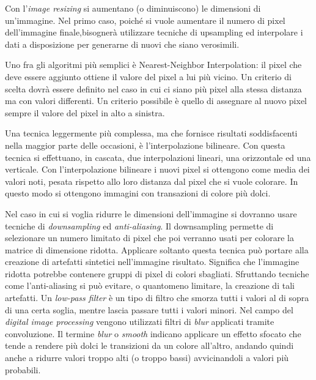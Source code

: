 Con l'\textit{image resizing} si aumentano (o diminuiscono) le dimensioni di un'immagine.
Nel primo caso, poiché si vuole aumentare il numero di pixel dell'immagine finale,bisognerà utilizzare tecniche di upsampling ed interpolare i dati a disposizione per generarne di nuovi che siano verosimili.

Uno fra gli algoritmi più semplici è Nearest-Neighbor Interpolation:
il pixel che deve essere aggiunto ottiene il valore del pixel a lui più vicino.
Un criterio di scelta dovrà essere definito nel caso in cui ci siano più pixel alla stessa distanza ma con valori differenti.
Un criterio possibile è quello di assegnare al nuovo pixel sempre il valore del pixel in alto a sinistra.

Una tecnica leggermente più complessa, ma che fornisce risultati soddisfacenti nella maggior parte delle occasioni, è l'interpolazione bilineare.
Con questa tecnica si effettuano, in cascata, due interpolazioni lineari, una orizzontale ed una verticale.
Con l'interpolazione bilineare i nuovi pixel si ottengono come media dei valori noti, pesata rispetto allo loro distanza dal pixel che si vuole colorare.
In questo modo si ottengono immagini con transazioni di colore più dolci.



Nel caso in cui si voglia ridurre le dimensioni dell'immagine si dovranno usare tecniche di \textit{downsampling} ed \textit{anti-aliasing}.
Il downsampling permette di selezionare un numero limitato di pixel che poi verranno usati per colorare la matrice di dimensione ridotta.
Applicare soltanto questa tecnica può portare alla creazione di artefatti sintetici nell'immagine risultato.
Significa che l'immagine ridotta potrebbe contenere gruppi di pixel di colori sbagliati.
Sfruttando tecniche come l'anti-aliasing si può evitare, o quantomeno limitare, la creazione di tali artefatti.
Un \textit{low-pass filter} è un tipo di filtro che smorza tutti i valori al di sopra di una certa soglia, mentre lascia passare tutti i valori minori.
Nel campo del \textit{digital image processing} vengono utilizzati filtri di \textit{blur} applicati tramite convoluzione.
Il termine \textit{blur} o \textit{smooth} indicano applicare un effetto sfocato che tende a rendere più dolci le transizioni da un colore all'altro, andando quindi anche a ridurre valori troppo alti (o troppo bassi) avvicinandoli a valori più probabili.


